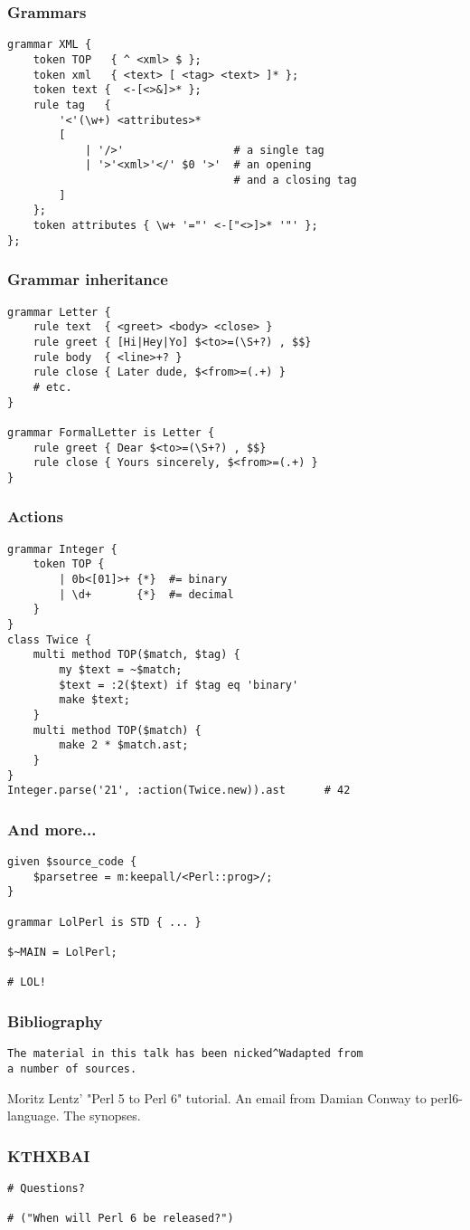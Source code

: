 \documentclass{beamer}
\begin{document}
\begin{frame}[fragile]
\frametitle{Grammars}
\begin{verbatim}
grammar XML {
    token TOP   { ^ <xml> $ };
    token xml   { <text> [ <tag> <text> ]* };
    token text {  <-[<>&]>* };
    rule tag   {
        '<'(\w+) <attributes>*
        [
            | '/>'                 # a single tag
            | '>'<xml>'</' $0 '>'  # an opening
                                   # and a closing tag
        ]
    };
    token attributes { \w+ '="' <-["<>]>* '"' };
};
\end{verbatim}
\end{frame}

\begin{frame}[fragile]
\frametitle{Grammar inheritance}
\begin{verbatim}
grammar Letter {
    rule text  { <greet> <body> <close> }
    rule greet { [Hi|Hey|Yo] $<to>=(\S+?) , $$}
    rule body  { <line>+? }
    rule close { Later dude, $<from>=(.+) }
    # etc.
}

grammar FormalLetter is Letter {
    rule greet { Dear $<to>=(\S+?) , $$}
    rule close { Yours sincerely, $<from>=(.+) }
}
\end{verbatim}
\end{frame}

\begin{frame}[fragile]
\frametitle{Actions}
\begin{verbatim}
grammar Integer {
    token TOP {
        | 0b<[01]>+ {*}  #= binary
        | \d+       {*}  #= decimal
    }
}
class Twice {
    multi method TOP($match, $tag) {
        my $text = ~$match;
        $text = :2($text) if $tag eq 'binary'
        make $text;
    }
    multi method TOP($match) {
        make 2 * $match.ast;
    }
}
Integer.parse('21', :action(Twice.new)).ast      # 42
\end{verbatim}
\end{frame}

\begin{frame}[fragile]
\frametitle{And more...}
\begin{verbatim}
given $source_code {
    $parsetree = m:keepall/<Perl::prog>/;
}

grammar LolPerl is STD { ... }

$~MAIN = LolPerl;

# LOL!
\end{verbatim}
\end{frame}

\begin{frame}[fragile]
\frametitle{Bibliography}
\begin{verbatim}
The material in this talk has been nicked^Wadapted from
a number of sources.
\end{verbatim}
\begin{thebibliography}{10} 
Moritz Lentz' "Perl 5 to Perl 6" tutorial.
An email from Damian Conway to perl6-language.
The synopses.
\end{thebibliography} 
\end{frame}

\begin{frame}[fragile]
\frametitle{KTHXBAI}
\begin{verbatim}
# Questions?

# ("When will Perl 6 be released?")
\end{verbatim}
\end{frame}
\end{document}
